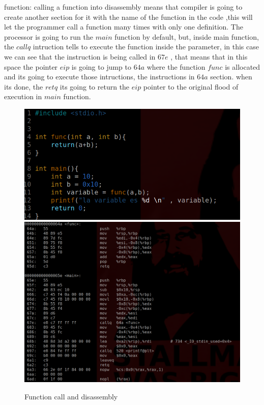 \documentclass[10pt,a4paper]{article} %
\begin{document}
        function:
        calling a function into disassembly means that compiler is going to
        create another section for it with the name of the function in the code
        ,this will let the programmer call a function many times with only one
        definition. The processor is going to run the $ main  $ function by
        default, but,
        inside main function, the $ callq  $ intruction tells to execute the
        function inside the parameter, in this case we can see that the
        instruction is being called in $ 67e  $  , that means that in this
        space the pointer $ eip  $ is going to jump to $ 64a  $ where the
        function $ func  $ is allocated and its going to execute those
        intructions, the instructions in $ 64a $ section. when its done, the $
        retq  $ its going to return the $ eip  $ pointer to the original flood
        of execution in $ main  $ function.
        \begin{figure}[h!]
            \centering
            \includegraphics[width=0.8\linewidth]{funccode.png}
            \includegraphics[width=0.8\linewidth]{funcdis.png}
            \caption{Function call and disassembly}
            \label{function}
        \end{figure}
\end{document}
